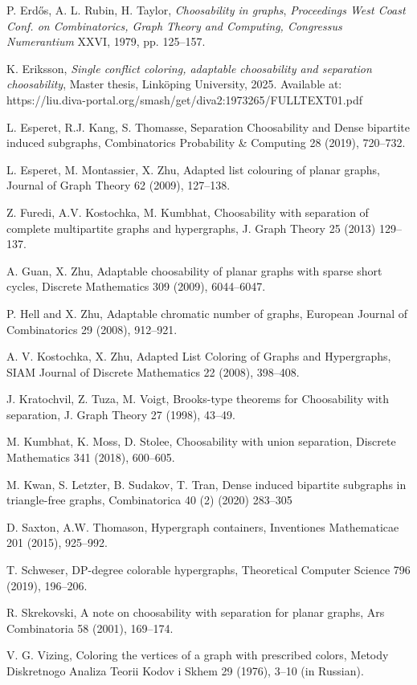 \documentclass[12pt]{article}
\begin{document}
\begin{thebibliography}{}
P. Erd\H os, A. L. Rubin, H. Taylor, 
\emph{Choosability in graphs},
\emph{Proceedings West Coast Conf. on Combinatorics, Graph Theory and Computing,
Congressus Numerantium} XXVI, 1979, pp. 125--157.

K. Eriksson, {\em Single conflict coloring, adaptable choosability and separation choosability},
Master thesis, Link\"oping University, 2025. Available at:
https://liu.diva-portal.org/smash/get/diva2:1973265/FULLTEXT01.pdf

L. Esperet, R.J. Kang, S. Thomasse,
Separation Choosability and Dense bipartite induced subgraphs,
Combinatorics Probability \& Computing 28 (2019), 720--732.

L. Esperet, M. Montassier, X. Zhu,
Adapted list colouring of planar graphs,
Journal of Graph Theory 62 (2009), 127--138.



Z. Furedi, A.V. Kostochka, M. Kumbhat,
Choosability with separation of complete multipartite graphs and hypergraphs,
J. Graph Theory 25 (2013) 129--137.

A. Guan, X. Zhu,
Adaptable choosability of planar graphs with sparse short cycles,
Discrete Mathematics 309 (2009), 6044--6047.

P. Hell and X. Zhu, Adaptable chromatic number of graphs, 
European Journal of Combinatorics 29 (2008), 912--921.



A. V. Kostochka, X. Zhu, Adapted List Coloring of Graphs and Hypergraphs,
SIAM Journal of Discrete Mathematics 22 (2008), 398--408.


J. Kratochvil, Z. Tuza, M. Voigt,
Brooks-type theorems for Choosability with separation,
J. Graph Theory 27 (1998), 43--49.


M. Kumbhat, K. Moss, D. Stolee,
Choosability with union separation,
Discrete Mathematics 341 (2018), 600--605.


M. Kwan, S. Letzter, B. Sudakov, T. Tran,
Dense induced bipartite subgraphs in
triangle-free graphs,
Combinatorica 40 (2) (2020) 283–305

D. Saxton, A.W. Thomason, Hypergraph containers, Inventiones 
Mathematicae 201 (2015), 925--992.

T. Schweser,
DP-degree colorable hypergraphs,
Theoretical Computer Science  796 (2019), 196--206.


R. Skrekovski, A note on choosability with separation for
planar graphs, Ars Combinatoria 58 (2001), 169--174.

V. G. Vizing, 
Coloring the vertices of a graph with prescribed colors,
Metody Diskretnogo Analiza Teorii Kodov i Skhem 29 (1976),
3--10 (in Russian). 


 \end{thebibliography}{}
\end{document}
